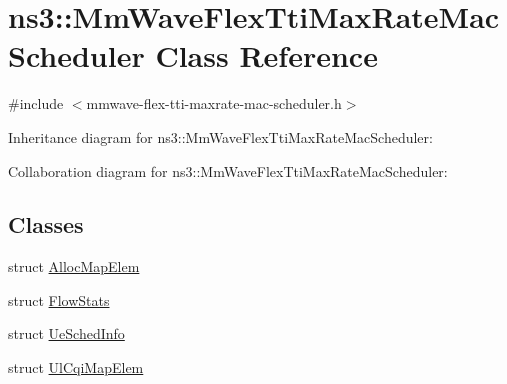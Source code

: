 \hypertarget{classns3_1_1MmWaveFlexTtiMaxRateMacScheduler}{}\section{ns3\+:\+:Mm\+Wave\+Flex\+Tti\+Max\+Rate\+Mac\+Scheduler Class Reference}
\label{classns3_1_1MmWaveFlexTtiMaxRateMacScheduler}


{\ttfamily \#include $<$mmwave-\/flex-\/tti-\/maxrate-\/mac-\/scheduler.\+h$>$}



Inheritance diagram for ns3\+:\+:Mm\+Wave\+Flex\+Tti\+Max\+Rate\+Mac\+Scheduler\+:


Collaboration diagram for ns3\+:\+:Mm\+Wave\+Flex\+Tti\+Max\+Rate\+Mac\+Scheduler\+:
\subsection*{Classes}
\begin{DoxyCompactItemize}
\item 
struct \hyperlink{structns3_1_1MmWaveFlexTtiMaxRateMacScheduler_1_1AllocMapElem}{Alloc\+Map\+Elem}
\item 
struct \hyperlink{structns3_1_1MmWaveFlexTtiMaxRateMacScheduler_1_1FlowStats}{Flow\+Stats}
\item 
struct \hyperlink{structns3_1_1MmWaveFlexTtiMaxRateMacScheduler_1_1UeSchedInfo}{Ue\+Sched\+Info}
\item 
struct \hyperlink{structns3_1_1MmWaveFlexTtiMaxRateMacScheduler_1_1UlCqiMapElem}{Ul\+Cqi\+Map\+Elem}
\end{DoxyCompactItemize}
